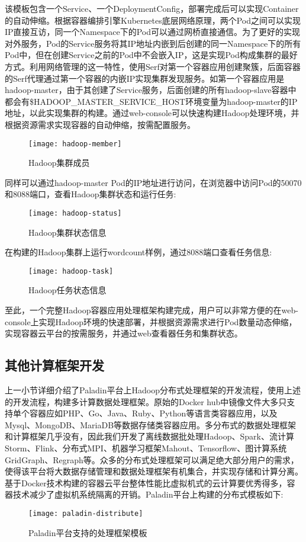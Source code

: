 该模板包含一个Service、一个DeploymentConfig，部署完成后可以实现Container的自动伸缩。根据容器编排引擎Kubernetes底层网络原理，两个Pod之间可以实现IP直接互访，同一个Namespace下的Pod可以通过网桥直接通信。为了更好的实现对外服务，Pod的Service服务将其IP地址内嵌到后创建的同一Namespace下的所有Pod中，但在创建Service之前的Pod中不会嵌入IP，这是实现Pod构成集群的最好方式。利用网络管理的这一特性，使用Serf对第一个容器应用创建聚簇，后面容器的Serf代理通过第一个容器的内嵌IP实现集群发现服务。如第一个容器应用是hadoop-master，由于其创建了Service服务，后面创建的所有hadoop-slave容器中都会有\$HADOOP\_MASTER\_SERVICE\_HOST环境变量为hadoop-master的IP地址，以此实现集群的构建。通过web-console可以快速构建Hadoop处理环境，并根据资源需求实现容器的自动伸缩，按需配置服务。
\begin{figure}[H] %
	\centering
	\texttt{[image: hadoop-member]}
	\caption{Hadoop集群成员}
\end{figure}

同样可以通过hadoop-master Pod的IP地址进行访问，在浏览器中访问Pod的50070和8088端口，查看Hadoop集群状态和运行任务:
\begin{figure}[H] %
	\centering
	\texttt{[image: hadoop-status]}
	\caption{Hadoop集群状态信息}
\end{figure}
在构建的Hadoop集群上运行wordcount样例，通过8088端口查看任务信息:
\begin{figure}[H] %
	\centering
	\texttt{[image: hadoop-task]}
	\caption{Hadoop任务状态信息}
\end{figure}

至此，一个完整Hadoop容器应用处理框架构建完成，用户可以非常方便的在web-console上实现Hadoop环境的快速部署，并根据资源需求进行Pod数量动态伸缩，实现容器云平台的按需服务，并通过web查看器任务和集群状态。

\subsection{其他计算框架开发}
上一小节详细介绍了Paladin平台上Hadoop分布式处理框架的开发流程，使用上述的开发流程，构建多计算数据处理框架。原始的Docker hub中镜像文件大多只支持单个容器应如PHP、Go、Java、Ruby、Python等语言类容器应用，以及Mysql、MongoDB、MariaDB等数据存储类容器应用。多分布式的数据处理框架和计算框架几乎没有，因此我们开发了离线数据批处理Hadoop、Spark、流计算Storm、Flink、分布式MPI、机器学习框架Mahout、Tensorflow、图计算系统GridGraph、Regraph等。众多的分布式处理框架可以满足绝大部分用户的需求，使得该平台将大数据存储管理和数据处理框架有机集合，并实现存储和计算分离。基于Docker技术构建的容器云平台整体性能比虚拟机式的云计算要优秀得多，容器技术减少了虚拟机系统隔离的开销。Paladin平台上构建的分布式模板如下:
\begin{figure}[H] %
	\centering
	\texttt{[image: paladin-distribute]}
	\caption{Paladin平台支持的处理框架模板}
\end{figure}

